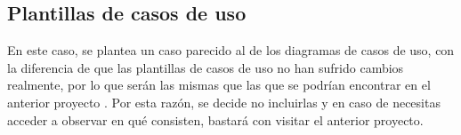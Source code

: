 
\subsection{Plantillas de casos de uso}

En este caso, se plantea un caso parecido al de los diagramas de casos de uso, con la diferencia de que las plantillas de casos de uso no han sufrido cambios realmente, por lo que serán las mismas que las que se podrían encontrar en el anterior proyecto \cite{tfm1}. Por esta razón, se decide no incluirlas y en caso de necesitas acceder a observar en qué consisten, bastará con visitar el anterior proyecto.